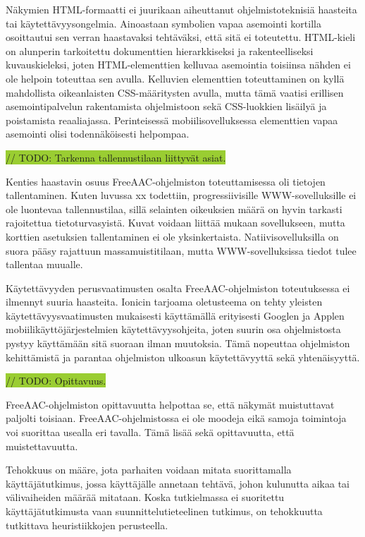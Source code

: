 \documentclass[utf8]{gradu3}
\begin{document}
Näkymien HTML-formaatti ei juurikaan aiheuttanut ohjelmistoteknisiä haasteita tai käytettävyysongelmia. Ainoastaan symbolien vapaa asemointi kortilla osoittautui sen verran haastavaksi tehtäväksi, että sitä ei toteutettu. HTML-kieli on alunperin tarkoitettu dokumenttien hierarkkiseksi ja rakenteelliseksi kuvauskieleksi, joten HTML-elementtien kelluvaa asemointia toisiinsa nähden ei ole helpoin toteuttaa sen avulla. Kelluvien elementtien toteuttaminen on kyllä mahdollista oikeanlaisten CSS-määritysten avulla, mutta tämä vaatisi erillisen asemointipalvelun rakentamista ohjelmistoon sekä CSS-luokkien lisäilyä ja poistamista reaaliajassa. Perinteisessä mobiilisovelluksessa elementtien vapaa asemointi olisi todennäköisesti helpompaa.

\colorbox{YellowGreen}{// TODO: Tarkenna tallennustilaan liittyvät asiat.}

Kenties haastavin osuus FreeAAC-ohjelmiston toteuttamisessa oli tietojen tallentaminen. Kuten luvussa xx todettiin, progressiivisille WWW-sovelluksille ei ole luontevaa tallennustilaa, sillä selainten oikeuksien määrä on hyvin tarkasti rajoitettua tietoturvasyistä. Kuvat voidaan liittää mukaan sovellukseen, mutta korttien asetuksien tallentaminen ei ole yksinkertaista. Natiivisovelluksilla on suora pääsy rajattuun massamuistitilaan, mutta WWW-sovelluksissa tiedot tulee tallentaa muualle.

Käytettävyyden perusvaatimusten osalta FreeAAC-ohjelmiston toteutuksessa ei ilmennyt suuria haasteita. Ionicin tarjoama oletusteema on tehty yleisten käytettävyysvaatimusten mukaisesti käyttämällä erityisesti Googlen ja Applen mobiilikäyttöjärjestelmien käytettävyysohjeita, joten suurin osa ohjelmistosta pystyy käyttämään sitä suoraan ilman muutoksia. Tämä nopeuttaa ohjelmiston kehittämistä ja parantaa ohjelmiston ulkoasun käytettävyyttä sekä yhtenäisyyttä.

\colorbox{YellowGreen}{// TODO: Opittavuus.}

FreeAAC-ohjelmiston opittavuutta helpottaa se, että näkymät muistuttavat paljolti toisiaan. FreeAAC-ohjelmistossa ei ole moodeja eikä samoja toimintoja voi suorittaa usealla eri tavalla. Tämä lisää sekä opittavuutta, että muistettavuutta.

Tehokkuus on määre, jota parhaiten voidaan mitata suorittamalla käyttäjätutkimus, jossa käyttäjälle annetaan tehtävä, johon kulunutta aikaa tai välivaiheiden määrää mitataan. Koska tutkielmassa ei suoritettu käyttäjätutkimusta vaan suunnittelutieteelinen tutkimus, on tehokkuutta tutkittava heuristiikkojen perusteella.
\end{document}
